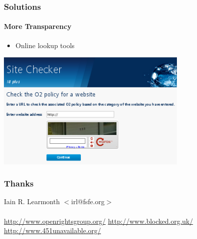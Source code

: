 \documentclass{beamer}
\begin{document}
\begin{frame}
	\frametitle{Solutions}
	\framesubtitle{More Transparency}
	\begin{itemize}
		\item{Online lookup tools}
	\end{itemize}
	\begin{center}
		\includegraphics[width=0.7\textwidth]{o2checker.png}
	\end{center}
\end{frame}

\begin{frame}
	\frametitle{Thanks}
	\begin{center}
		{\LARGE Iain R. Learmonth $<$irl@fsfe.org$>$}
		\ \\ \ \\
		{\LARGE \url{http://www.openrightsgroup.org/}}
		{\LARGE \url{http://www.blocked.org.uk/}}
		{\LARGE \url{http://www.451unavailable.org/}}
	\end{center}
\end{frame}
\end{document}
